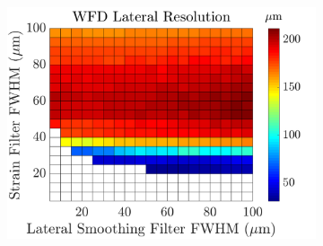 \begin{figure}[b!]
\begin{subfigure}{0.49\textwidth}
		\includegraphics[width=\textwidth]{imageres_figs/wfd_lateral.png}
	\end{subfigure}
	\\
\end{figure}
